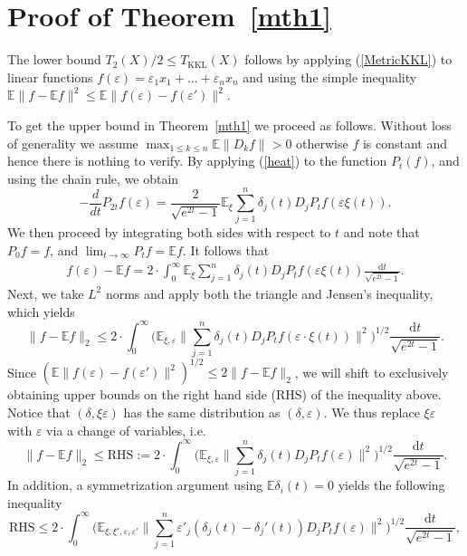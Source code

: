 \section{Proof of Theorem~\ref{mth1}}\label{ss45}
The lower bound $T_{2}(X)/2 \leq T_{\mathrm{KKL}}(X)$ follows by applying (\ref{MetricKKL}) to linear functions $f(\varepsilon)=\varepsilon_{1} x_{1}+\ldots+\varepsilon_{n} x_{n}$ and using the simple inequality $\mathbb{E}\| f-\mathbb{E}f \|^{2} \leq \mathbb{E} \| f(\varepsilon) - f(\varepsilon')\|^{2}$. 



  To get the upper bound in Theorem~\ref{mth1} we proceed as follows. Without loss of generality we assume $\max_{1\leq k \leq n} \mathbb{E} \| D_{k} f\| >0$ otherwise $f$ is constant and hence there is nothing to verify.   By applying (\ref{heat}) to the function $P_t(f)$, and using the chain rule, we obtain 
   \[-\frac{d}{dt}P_{2t} f(\varepsilon) = \frac{2}{\sqrt{e^{2t} - 1}}\mathbb{E}_\xi \sum_{j=1}^n \delta_j(t) D_j P_tf(\varepsilon\xi(t)).\]
   We then proceed by integrating both sides with respect to $t$ and note that $P_{0}f = f$,  and $\lim_{t \to \infty}P_{t}f = \mathbb{E}f$.
   It follows that
   \begin{align}\label{chainr}
   f(\varepsilon) - \mathbb{E}f = 2\cdot\int_0^\infty \mathbb{E}_\xi \sum_{j=1}^n \delta_j(t) D_j P_tf(\varepsilon\xi(t))\frac{\mathrm{d}t}{\sqrt{e^{2t}-1}}.
   \end{align}
   Next, we take $L^2$ norms and apply both the triangle and Jensen's inequality, which yields
   \[\|f-\mathbb{E}f\|_2\leq 2\cdot\int_0^\infty \Big(\mathbb{E}_{\xi,\varepsilon}\Big\| \sum_{j=1}^n \delta_j(t) D_j P_tf(\varepsilon\cdot\xi(t))\Big\|^2\Big)^{1/2}\frac{\mathrm{d}t}{\sqrt{e^{2t}-1}}.\]
   Since $(\mathbb{E} \| f(\varepsilon) - f(\varepsilon')\|^{2})^{1/2} \leq 2  \| f-\mathbb{E} f\|_{2}$,  we will shift to exclusively obtaining upper bounds on the right hand side (RHS) of the inequality above. Notice that  $(\delta,\xi\varepsilon)$ has the same  distribution as $(\delta,\varepsilon)$.  We thus replace $\xi\varepsilon$ with $\varepsilon$ via a change of variables, i.e.
   \[\|f-\mathbb{E}f\|_2\leq \text{RHS} :=  2\cdot\int_0^\infty \Big(\mathbb{E}_{\xi,\varepsilon}\Big\| \sum_{j=1}^n \delta_j(t) D_j P_tf(\varepsilon)\Big\|^2\Big)^{1/2} \frac{\mathrm{d}t}{\sqrt{e^{2t}-1}}.\]
   In addition, a symmetrization argument using $\mathbb{E}\delta_i(t) = 0$ yields the following inequality
   \[\text{RHS} \leq  2\cdot\int_0^\infty \Big(\mathbb{E}_{\xi,\xi',\varepsilon,\varepsilon'}\Big\| \sum_{j=1}^n \varepsilon'_j(\delta_j(t)-\delta_j'(t)) D_j P_tf(\varepsilon)\Big\|^2\Big)^{1/2} \frac{\mathrm{d}t}{\sqrt{e^{2t}-1}},\]
